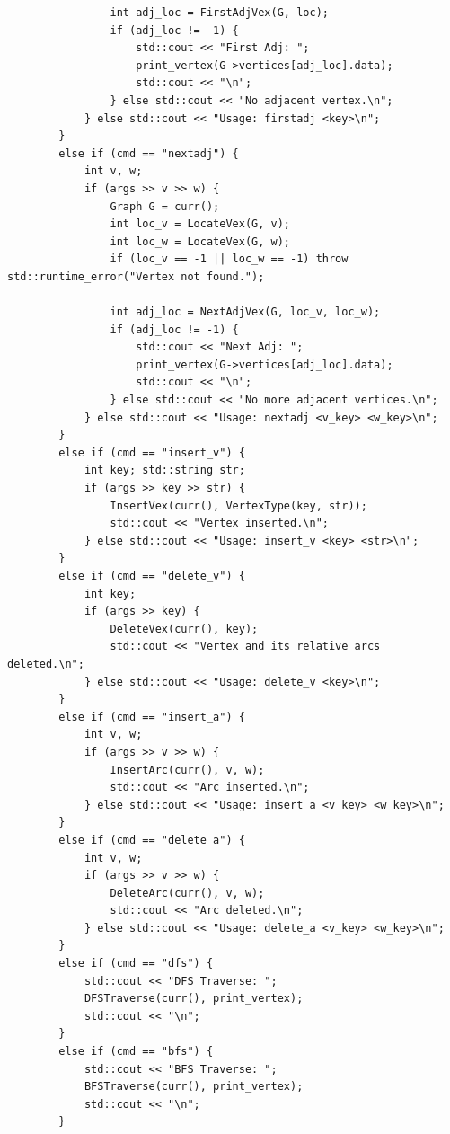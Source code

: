 \documentclass[supercite]{Experimental_Report}
\theoremstyle{definition}
\begin{document}
\begin{lstlisting}
				int adj_loc = FirstAdjVex(G, loc);
				if (adj_loc != -1) {
					std::cout << "First Adj: ";
					print_vertex(G->vertices[adj_loc].data);
					std::cout << "\n";
				} else std::cout << "No adjacent vertex.\n";
			} else std::cout << "Usage: firstadj <key>\n";
		}
		else if (cmd == "nextadj") {
			int v, w;
			if (args >> v >> w) {
				Graph G = curr();
				int loc_v = LocateVex(G, v);
				int loc_w = LocateVex(G, w);
				if (loc_v == -1 || loc_w == -1) throw std::runtime_error("Vertex not found.");
				
				int adj_loc = NextAdjVex(G, loc_v, loc_w);
				if (adj_loc != -1) {
					std::cout << "Next Adj: ";
					print_vertex(G->vertices[adj_loc].data);
					std::cout << "\n";
				} else std::cout << "No more adjacent vertices.\n";
			} else std::cout << "Usage: nextadj <v_key> <w_key>\n";
		}
		else if (cmd == "insert_v") {
			int key; std::string str;
			if (args >> key >> str) {
				InsertVex(curr(), VertexType(key, str));
				std::cout << "Vertex inserted.\n";
			} else std::cout << "Usage: insert_v <key> <str>\n";
		}
		else if (cmd == "delete_v") {
			int key;
			if (args >> key) {
				DeleteVex(curr(), key);
				std::cout << "Vertex and its relative arcs deleted.\n";
			} else std::cout << "Usage: delete_v <key>\n";
		}
		else if (cmd == "insert_a") {
			int v, w;
			if (args >> v >> w) {
				InsertArc(curr(), v, w);
				std::cout << "Arc inserted.\n";
			} else std::cout << "Usage: insert_a <v_key> <w_key>\n";
		}
		else if (cmd == "delete_a") {
			int v, w;
			if (args >> v >> w) {
				DeleteArc(curr(), v, w);
				std::cout << "Arc deleted.\n";
			} else std::cout << "Usage: delete_a <v_key> <w_key>\n";
		}
		else if (cmd == "dfs") {
			std::cout << "DFS Traverse: ";
			DFSTraverse(curr(), print_vertex);
			std::cout << "\n";
		}
		else if (cmd == "bfs") {
			std::cout << "BFS Traverse: ";
			BFSTraverse(curr(), print_vertex);
			std::cout << "\n";
		}
		

\end{lstlisting}
\end{document}
